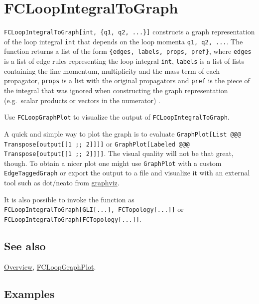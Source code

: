 \documentclass[../FeynCalcManual.tex]{subfiles}
\begin{document}
\hypertarget{fcloopintegraltograph}{%
\section{FCLoopIntegralToGraph}\label{fcloopintegraltograph}}

\texttt{FCLoopIntegralToGraph[\allowbreak{}int,\ \allowbreak{}\{\allowbreak{}q1,\ \allowbreak{}q2,\ \allowbreak{}...\}]}
constructs a graph representation of the loop integral \texttt{int} that
depends on the loop momenta
\texttt{q1,\ \allowbreak{}q2,\ \allowbreak{}...}. The function returns a
list of the form
\texttt{\{\allowbreak{}edges,\ \allowbreak{}labels,\ \allowbreak{}props,\ \allowbreak{}pref\}},
where \texttt{edges} is a list of edge rules representing the loop
integral \texttt{int}, \texttt{labels} is a list of lists containing the
line momentum, multiplicity and the mass term of each propagator,
\texttt{props} is a list with the original propagators and \texttt{pref}
is the piece of the integral that was ignored when constructing the
graph representation (e.g.~scalar products or vectors in the numerator)
.

Use \texttt{FCLoopGraphPlot} to visualize the output of
\texttt{FCLoopIntegralToGraph}.

A quick and simple way to plot the graph is to evaluate
\texttt{GraphPlot[\allowbreak{}List @@@ Transpose[\allowbreak{}output[\allowbreak{}[\allowbreak{}1 ;; 2]]]]}
or
\texttt{GraphPlot[\allowbreak{}Labeled @@@ Transpose[\allowbreak{}output[\allowbreak{}[\allowbreak{}1 ;; 2]]]]}.
The visual quality will not be that great, though. To obtain a nicer
plot one might use \texttt{GraphPlot} with a custom
\texttt{EdgeTaggedGraph} or export the output to a file and visualize it
with an external tool such as dot/neato from
\href{https://graphviz.org/}{graphviz}.

It is also possible to invoke the function as
\texttt{FCLoopIntegralToGraph[\allowbreak{}GLI[\allowbreak{}...],\ \allowbreak{}FCTopology[\allowbreak{}...]]}
or
\texttt{FCLoopIntegralToGraph[\allowbreak{}FCTopology[\allowbreak{}...]]}.

\subsection{See also}

\hyperlink{toc}{Overview}, \hyperlink{fcloopgraphplot}{FCLoopGraphPlot}.

\subsection{Examples}
\end{document}
